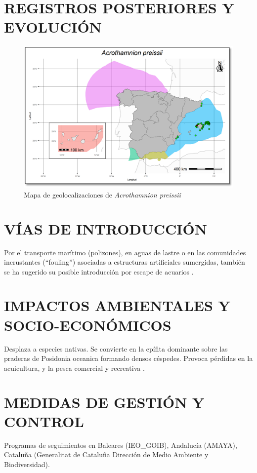 \documentclass{article}
\begin{document}
\section*{REGISTROS POSTERIORES Y EVOLUCIÓN}
\begin{figure}[h]
\includegraphics{./images/mapa.png}
\caption{Mapa de geolocalizaciones de \textit{Acrothamnion preissii}}
\end{figure}


\section*{VÍAS DE INTRODUCCIÓN}
Por el transporte marítimo (polizones), en aguas de lastre o en las comunidades incrustantes (“fouling”) asociadas a estructuras artificiales sumergidas, también se ha sugerido su posible introducción por escape de acuarios \cite{acro2}.

\section*{IMPACTOS AMBIENTALES Y SOCIO-ECONÓMICOS}
Desplaza a especies nativas. Se convierte en la epífita dominante sobre las praderas de Posidonia oceanica formando densos céspedes. Provoca pérdidas en la acuicultura, y la pesca comercial y recreativa \cite{acro2}.

\section*{MEDIDAS DE GESTIÓN Y CONTROL}
Programas de seguimientos en Baleares  (IEO\_GOIB), Andalucía (AMAYA), Cataluña (Generalitat de Cataluña Dirección de Medio Ambiente y Biodiversidad).
\end{document}
